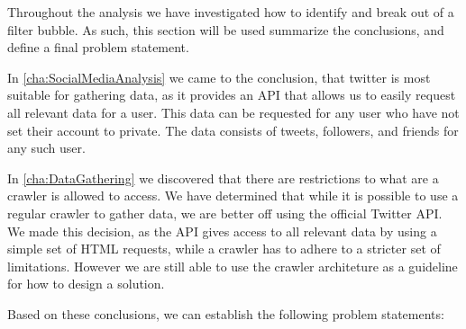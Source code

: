 
Throughout the analysis we have investigated how to identify and break out of a
filter bubble. As such, this section will be used summarize the
conclusions, and define a final problem statement.\nl

In \autoref{cha:SocialMediaAnalysis} we came to the conclusion, that twitter
is most suitable for gathering data, as it provides an API that allows us to easily
request all relevant data for a user. This data can be requested for any user
who have not set their account to private. The data consists of tweets,
followers, and friends for any such user.\nl

In \autoref{cha:DataGathering} we discovered that there are restrictions to what
are a crawler is allowed to access. We have determined that while it is
possible to use a regular crawler to gather data, we are better off using the
official Twitter API. We made this decision, as the API gives access to all
relevant data by using a simple set of HTML requests, while a crawler has to
adhere to a stricter set of limitations. However we are still able to use the
crawler architeture as a guideline for how to design a solution.\nl





Based on these conclusions, we can establish the following problem statements:

\begin{center}
\begin{minipage}{0.95\linewidth} 


\end{minipage}
\end{center}




